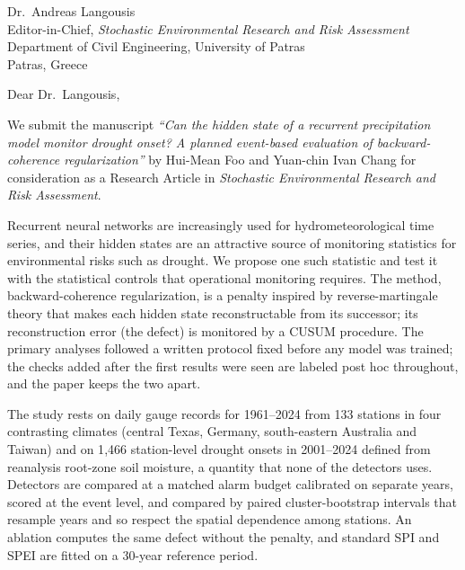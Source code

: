 \documentclass[11pt,a4paper]{letter}
\date{November 26, 2026}
\begin{document}
\begin{letter}{Dr.\ Andreas Langousis\\
Editor-in-Chief, \emph{Stochastic Environmental Research and Risk Assessment}\\
Department of Civil Engineering, University of Patras\\
Patras, Greece}

\opening{Dear Dr.\ Langousis,}

We submit the manuscript \emph{``Can the hidden state of a recurrent precipitation model monitor
drought onset? A planned event-based evaluation of backward-coherence regularization''} by
Hui-Mean Foo and Yuan-chin Ivan Chang for consideration as a Research Article in \emph{Stochastic
Environmental Research and Risk Assessment}.

Recurrent neural networks are increasingly used for hydrometeorological time series, and their hidden
states are an attractive source of monitoring statistics for environmental risks such as drought. We
propose one such statistic and test it with the statistical controls that operational monitoring
requires. The method, backward-coherence regularization, is a penalty inspired by reverse-martingale
theory that makes each hidden state reconstructable from its successor; its reconstruction error (the
defect) is monitored by a CUSUM procedure. The primary analyses followed a written protocol fixed before
any model was trained; the checks added after the first results were seen are labeled post hoc
throughout, and the paper keeps the two apart.

The study rests on daily gauge records for 1961--2024 from 133 stations in four contrasting climates
(central Texas, Germany, south-eastern Australia and Taiwan) and on 1{,}466 station-level drought onsets
in 2001--2024 defined from reanalysis root-zone soil moisture, a quantity that none of the detectors uses.
Detectors are compared at a matched alarm budget calibrated on separate years, scored at the event level,
and compared by paired cluster-bootstrap intervals that resample years and so respect the spatial
dependence among stations. An ablation computes the same defect without the penalty, and standard SPI and
SPEI are fitted on a 30-year reference period.


\end{letter}
\end{document}
